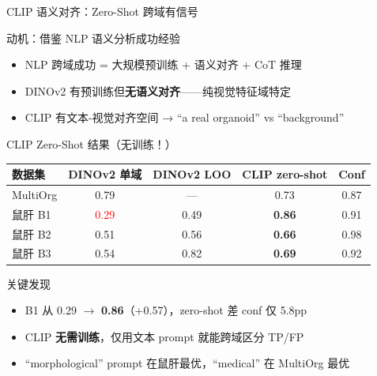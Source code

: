 \documentclass[aspectratio=169, 10pt]{beamer}
\begin{document}
\begin{frame}{CLIP 语义对齐：Zero-Shot 跨域有信号}
  \begin{block}{动机：借鉴 NLP 语义分析成功经验}
    \begin{itemize}
      \item NLP 跨域成功 = 大规模预训练 + 语义对齐 + CoT 推理
      \item DINOv2 有预训练但\textbf{无语义对齐}——纯视觉特征域特定
      \item CLIP 有文本-视觉对齐空间 → ``a real organoid'' vs ``background''
    \end{itemize}
  \end{block}
  \vspace{0em}
  \begin{alertblock}{CLIP Zero-Shot 结果（无训练！）}
    \footnotesize
    \begin{tabular}{lcccc}
      \toprule
      \textbf{数据集} & \textbf{DINOv2 单域} & \textbf{DINOv2 LOO} & \textbf{CLIP zero-shot} & \textbf{Conf} \\
      \midrule
      MultiOrg & 0.79 & — & 0.73 & 0.87 \\
      鼠肝 B1 & \textcolor{red}{0.29} & 0.49 & \textbf{0.86} & 0.91 \\
      鼠肝 B2 & 0.51 & 0.56 & \textbf{0.66} & 0.98 \\
      鼠肝 B3 & 0.54 & 0.82 & \textbf{0.69} & 0.92 \\
      \bottomrule
    \end{tabular}
  \end{alertblock}
  \vspace{0em}
  \begin{block}{关键发现}
    \begin{itemize}
      \item B1 从 0.29 $\to$ \textbf{0.86}（+0.57），zero-shot 差 conf 仅 5.8pp
      \item CLIP \textbf{无需训练}，仅用文本 prompt 就能跨域区分 TP/FP
      \item ``morphological'' prompt 在鼠肝最优，``medical'' 在 MultiOrg 最优
    \end{itemize}
  \end{block}
\end{frame}
\end{document}
